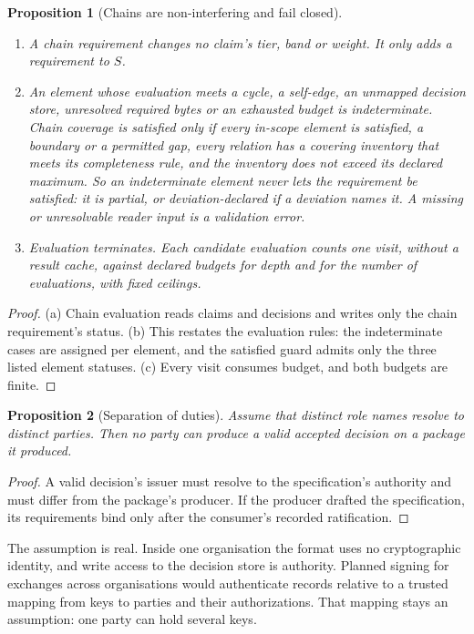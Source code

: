 \documentclass[11pt]{article}
\newtheorem{proposition}{Proposition}
\theoremstyle{definition}
\theoremstyle{remark}
\begin{document}
\begin{proposition}[Chains are non-interfering and fail closed]\label{prop:chain}
\leavevmode
\begin{enumerate}[label=(\alph*),itemsep=1pt]
\item A chain requirement changes no claim's tier, band or weight. It only adds a requirement to
  $S$.
\item An element whose evaluation meets a cycle, a self-edge, an unmapped decision store,
  unresolved required bytes or an exhausted budget is \emph{indeterminate}. Chain coverage is
  satisfied only if every in-scope element is satisfied, a boundary or a permitted gap, every
  relation has a covering inventory that meets its completeness rule, and the inventory does not
  exceed its declared maximum. So an indeterminate element never lets the requirement be
  satisfied: it is partial, or deviation-declared if a deviation names it. A missing or
  unresolvable reader input is a validation error.
\item Evaluation terminates. Each candidate evaluation counts one visit, without a result cache,
  against declared budgets for depth and for the number of evaluations, with fixed ceilings.
\end{enumerate}
\end{proposition}
\begin{proof}
(a) Chain evaluation reads claims and decisions and writes only the chain requirement's status.
(b) This restates the evaluation rules: the indeterminate cases are assigned per element, and the
satisfied guard admits only the three listed element statuses. (c) Every visit consumes budget,
and both budgets are finite.
\end{proof}

\begin{proposition}[Separation of duties]\label{prop:sod}
Assume that distinct role names resolve to distinct parties. Then no party can produce a valid
accepted decision on a package it produced.
\end{proposition}
\begin{proof}
A valid decision's issuer must resolve to the specification's authority and must differ from the
package's producer. If the producer drafted the specification, its requirements bind only after
the consumer's recorded ratification.
\end{proof}
\noindent The assumption is real. Inside one organisation the format uses no cryptographic
identity, and write access to the decision store is authority. Planned signing for exchanges
across organisations would authenticate records relative to a trusted mapping from keys to
parties and their authorizations. That mapping stays an assumption: one party can hold several
keys.
\end{document}
